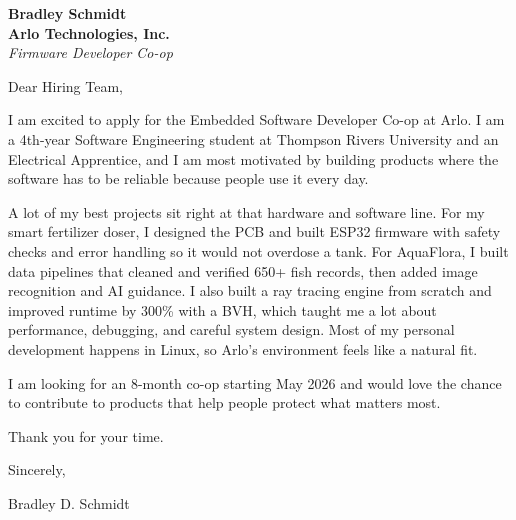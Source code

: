 \documentclass[11pt]{article}
\begin{document}
\textbf{Bradley Schmidt}\\
\vspace{0.5em}
\textbf{Arlo Technologies, Inc.}\\
\textit{Firmware Developer Co-op}

Dear Hiring Team,

\par

I am excited to apply for the Embedded Software Developer Co-op at Arlo. I am a 4th-year Software Engineering student at Thompson Rivers University and an Electrical Apprentice, and I am most motivated by building products where the software has to be reliable because people use it every day.

\par

A lot of my best projects sit right at that hardware and software line. For my smart fertilizer doser, I designed the PCB and built ESP32 firmware with safety checks and error handling so it would not overdose a tank. For AquaFlora, I built data pipelines that cleaned and verified 650+ fish records, then added image recognition and AI guidance. I also built a ray tracing engine from scratch and improved runtime by 300\% with a BVH, which taught me a lot about performance, debugging, and careful system design. Most of my personal development happens in Linux, so Arlo's environment feels like a natural fit.

\par

I am looking for an 8-month co-op starting May 2026 and would love the chance to contribute to products that help people protect what matters most.

\par

Thank you for your time.

\par

Sincerely,

\par

Bradley D. Schmidt
\end{document}
